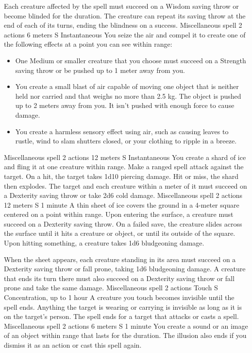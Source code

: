     Each creature affected by the spell must succeed on a Wisdom saving throw or become blinded for the duration.
    The creature can repeat its saving throw at the end of each of its turns, ending the blindness on a success.
    {Miscellaneous spell}
    {2 actions}
    {6 meters}
    {S}
    {Instantaneous}
    You seize the air and compel it to create one of the following effects at a point you can see within range:
    \begin{itemize}
        \item One Medium or smaller creature that you choose must succeed on a Strength saving throw or be pushed up to 1 meter away from you.
        \item You create a small blast of air capable of moving one object that is neither held nor carried and that weighs no more than 2.5 kg.
        The object is pushed up to 2 meters away from you.
        It isn't pushed with enough force to cause damage.
        \item You create a harmless sensory effect using air, such as causing leaves to rustle, wind to slam shutters closed, or your clothing to ripple in a breeze.
    \end{itemize}
    {Miscellaneous spell}
    {2 actions}
    {12 meters}
    {S}
    {Instantaneous}
    You create a shard of ice and fling it at one creature within range.
    Make a ranged spell attack against the target.
    On a hit, the target takes 1d10 piercing damage.
    Hit or miss, the shard then explodes.
    The target and each creature within a meter of it must succeed on a Dexterity saving throw or take 2d6 cold damage.
    {Miscellaneous spell}
    {2 actions}
    {12 meters}
    {S}
    {1 minute}
    A thin sheet of ice covers the ground in a 4-meter square centered on a point within range.
    Upon entering the surface, a creature must succeed on a Dexterity saving throw.
    On a failed save, the creature slides across the surface until it hits a creature or object, or until its outside of the square.
    Upon hitting something, a creature takes 1d6 bludgeoning damage.

    When the sheet appears, each creature standing in its area must succeed on a Dexterity saving throw or fall prone, taking 1d6 bludgeoning damage.
    A creature that ends its turn there must also succeed on a Dexterity saving throw or fall prone and take the same damage.
    {Miscellaneous spell}
    {2 actions}
    {Touch}
    {S}
    {Concentration, up to 1 hour}
    A creature you touch becomes invisible until the spell ends.
    Anything the target is wearing or carrying is invisible as long as it is on the target's person.
    The spell ends for a target that attacks or casts a spell.
    {Miscellaneous spell}
    {2 actions}
    {6 meters}
    {S}
    {1 minute}
    You create a sound or an image of an object within range that lasts for the duration.
    The illusion also ends if you dismiss it as an action or cast this spell again.

